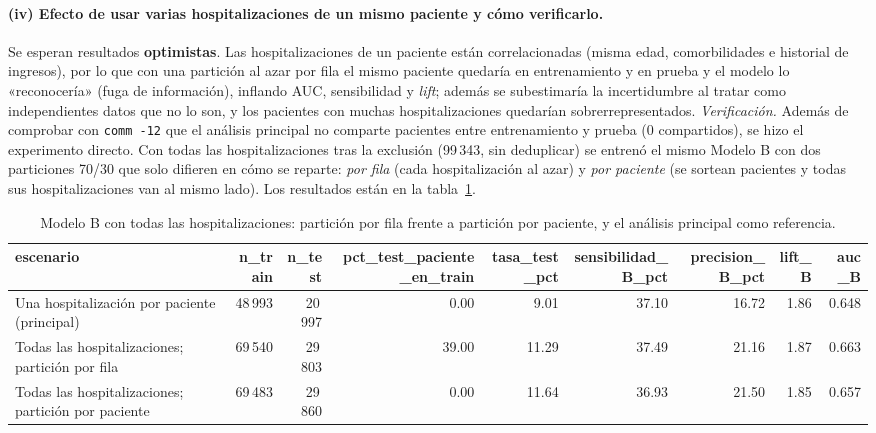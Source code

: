 \documentclass[11pt,a4paper]{article}
\newcommand{\cod}[1]{\texttt{#1}}
\newenvironment{tablaentex}[2]{%
  \begin{table}[H]\centering\small\caption{#1}\label{#2}\begin{adjustbox}{max width=\textwidth}}%
  {\end{adjustbox}\end{table}}
\begin{document}
\paragraph{(iv) Efecto de usar varias hospitalizaciones de un mismo paciente y cómo verificarlo.}
Se esperan resultados \textbf{optimistas}. Las hospitalizaciones de un paciente están correlacionadas (misma edad, comorbilidades e historial de ingresos), por lo que con una partición al azar por fila el mismo paciente quedaría en entrenamiento y en prueba y el modelo lo «reconocería» (fuga de información), inflando AUC, sensibilidad y \emph{lift}; además se subestimaría la incertidumbre al tratar como independientes datos que no lo son, y los pacientes con muchas hospitalizaciones quedarían sobrerrepresentados. \emph{Verificación.} Además de comprobar con \cod{comm -12} que el análisis principal no comparte pacientes entre entrenamiento y prueba (0 compartidos), se hizo el experimento directo. Con todas las hospitalizaciones tras la exclusión (99\,343, sin deduplicar) se entrenó el mismo Modelo B con dos particiones 70/30 que solo difieren en cómo se reparte: \emph{por fila} (cada hospitalización al azar) y \emph{por paciente} (se sortean pacientes y todas sus hospitalizaciones van al mismo lado). Los resultados están en la tabla~\ref{tab:fuga}.
\begin{tablaentex}{Modelo B con todas las hospitalizaciones: partición por fila frente a partición por paciente, y el análisis principal como referencia.}{tab:fuga}
\begin{tabular}{lrrrrrrrr}
\toprule
escenario & n\_train & n\_test & pct\_test\_paciente\_en\_train & tasa\_test\_pct & sensibilidad\_B\_pct & precision\_B\_pct & lift\_B & auc\_B \\
\midrule
Una hospitalización por paciente (principal) & 48\,993 & 20\,997 & 0.00 & 9.01 & 37.10 & 16.72 & 1.86 & 0.648 \\
Todas las hospitalizaciones; partición por fila & 69\,540 & 29\,803 & 39.00 & 11.29 & 37.49 & 21.16 & 1.87 & 0.663 \\
Todas las hospitalizaciones; partición por paciente & 69\,483 & 29\,860 & 0.00 & 11.64 & 36.93 & 21.50 & 1.85 & 0.657 \\
\bottomrule
\end{tabular}
\end{tablaentex}
\end{document}
